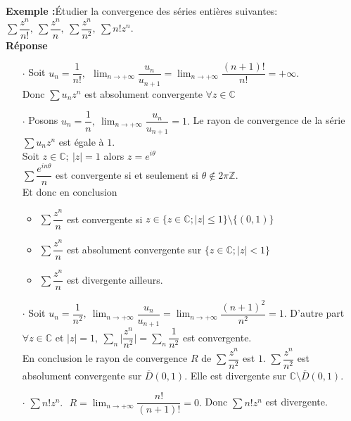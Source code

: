 \documentclass[11pt, a4paper]{book}
\begin{document}
\textbf{Exemple :}\quad \'Etudier la convergence des s\'eries enti\`eres suivantes: $\sum \dfrac{z^n}{n!},~\sum \dfrac{z^n}{n},~ \sum\dfrac{z^n}{n^2},~\sum n! z^n.$ \\
\textbf{R\'eponse} 
\begin{enumerate}
\item[$\cdot$] Soit ${\displaystyle u_n=\dfrac{1}{n!},~~\lim_{n\rightarrow+\infty}\dfrac{u_n}{u_{n+1}}=\lim_{n\rightarrow+\infty}\dfrac{(n+1)!}{n!}=+\infty.}$\\ Donc $\sum u_nz^n$ est absolument convergente $\forall z\in \mathbb{C}$
\item[$\cdot$] Posons ${\displaystyle u_n=\dfrac{1}{n},~\lim_{n\rightarrow+\infty}\dfrac{u_n}{u_{n+1}}=1.}$ Le rayon de convergence de la s\'erie $\sum u_n z^n$ est \'egale \`a $1$.\\
Soit $z\in \mathbb{C};~|z|=1$ alors $z=e^{i\theta}$\\
$\sum \dfrac{e^{in\theta}}{n}$ est convergente si et seulement si $\theta \notin 2\pi\mathbb{Z}.$\\
Et donc en conclusion \begin{itemize}
\item $\sum \dfrac{z^n}{n}$ est convergente si $z\in\{z\in \mathbb{C};|z|\leq1\}\setminus\{(0,1)\}$\\
\item $\sum \dfrac{z^n}{n}$ est absolument convergente sur $\{z\in \mathbb{C};|z|<1\}$\\
\item$\sum \dfrac{z^n}{n}$ est divergente ailleurs.
\end{itemize}
\item[$\cdot$] Soit ${\displaystyle u_n=\dfrac{1}{n^2},~\lim_{n\rightarrow+\infty}\dfrac{u_n}{u_{n+1}}=\lim_{n\to+\infty}\dfrac{(n+1)^2}{n^2}=1.}$ D'autre part $\forall z\in \mathbb{C}$ et $|z|=1,~\sum_n \Big|\dfrac{z^n}{n^2}\Big|=\sum_n \dfrac{1}{n^2}$ est convergente.\\
En conclusion le rayon de convergence $R$ de $\sum \dfrac{z^n}{n^2}$ est $1$. $\sum \dfrac{z^n}{n^2}$ est absolument convergente sur $\overline{D}(0,1).$ Elle est divergente sur $\mathbb{C}\setminus\overline{D}(0,1).$ \\
\item[$\cdot$] ${\displaystyle\sum n!z^n.~~~R=\lim_{n\rightarrow+\infty}\dfrac{n!}{(n+1)!}=0.}$ Donc $\sum n!z^n$ est divergente.
\end{enumerate}
\end{document}
